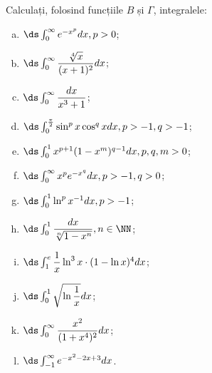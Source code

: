 Calculați, folosind funcțiile $ B $ și $ \Gamma $, integralele:
\begin{enumerate}[(a)]
\item $ \ds\int_0^\infty e^{-x^p} dx, p > 0 $;
\item $ \ds\int_0^\infty \dfrac{\sqrt[4]{x}}{(x + 1)^2} dx $;
\item $ \ds\int_0^\infty \dfrac{dx}{x^3 + 1} $;
\item $ \ds\int_0^{\frac{\pi}{2}} \sin^p x \cos^q x dx, p > -1, q > -1 $;
\item $ \ds\int_0^1 x^{p + 1}(1 - x^m)^{q - 1} dx, p, q, m > 0 $;
\item $ \ds\int_0^\infty x^p e^{-x^q} dx, p > -1, q > 0 $;
\item $ \ds\int_0^1 \ln^p x^{-1} dx, p > -1 $;
\item $ \ds\int_0^1 \dfrac{dx}{\sqrt[n]{1 - x^n}}, n \in \NN $;
\item $ \ds\int_1^e \dfrac{1}{x} \ln^3 x \cdot (1 - \ln x)^4 dx $;
\item $ \ds\int_0^1 \sqrt{\ln\dfrac{1}{x}} dx $;
\item $ \ds\int_0^\infty \dfrac{x^2}{(1 + x^4)^2} dx $;
\item $ \ds\int_{-1}^\infty e^{-x^2 - 2x + 3} dx $.
\end{enumerate}

